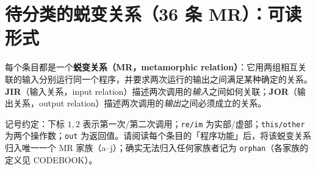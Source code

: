 \documentclass[11pt]{article}
\begin{document}
\small
\section*{待分类的蜕变关系（36 条 MR）：可读形式}
每个条目都是一个\textbf{蜕变关系（MR，metamorphic relation）}：它用两组相互关联的输入分别运行同一个程序，并要求两次运行的输出之间满足某种确定的关系。\textbf{JIR}（输入关系，input relation）描述两次调用的\emph{输入}之间如何关联；\textbf{JOR}（输出关系，output relation）描述两次调用的\emph{输出}之间必须成立的关系。
\par\medskip
记号约定：下标 $1,2$ 表示第一次/第二次调用；\texttt{re/im} 为实部/虚部；\texttt{this/other} 为两个操作数；\texttt{out} 为返回值。请阅读每个条目的「程序功能」后，将该蜕变关系归入唯一一个 MR 家族（a--j）；确实无法归入任何家族者记为 \texttt{orphan}（各家族的定义见 CODEBOOK）。
\bigskip
\end{document}
